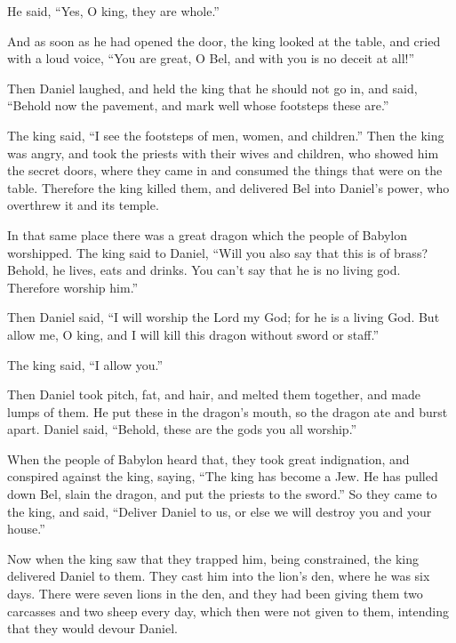 He said, ``Yes, O king, they are whole.''

 And as soon as he had opened the door, the king looked at
the table, and cried with a loud voice, ``You are great, O Bel, and with
you is no deceit at all!''

 Then Daniel laughed, and held the king that he should not
go in, and said, ``Behold now the pavement, and mark well whose
footsteps these are.''

 The king said, ``I see the footsteps of men, women, and
children.'' Then the king was angry,  and took the priests
with their wives and children, who showed him the secret doors, where
they came in and consumed the things that were on the table.
 Therefore the king killed them, and delivered Bel into
Daniel's power, who overthrew it and its temple.

 In that same place there was a great dragon which the
people of Babylon worshipped.  The king said to Daniel,
``Will you also say that this is of brass? Behold, he lives, eats and
drinks. You can't say that he is no living god. Therefore worship him.''

 Then Daniel said, ``I will worship the Lord my God; for he
is a living God.  But allow me, O king, and I will kill
this dragon without sword or staff.''

The king said, ``I allow you.''

 Then Daniel took pitch, fat, and hair, and melted them
together, and made lumps of them. He put these in the dragon's mouth, so
the dragon ate and burst apart. Daniel said, ``Behold, these are the
gods you all worship.''

 When the people of Babylon heard that, they took great
indignation, and conspired against the king, saying, ``The king has
become a Jew. He has pulled down Bel, slain the dragon, and put the
priests to the sword.''  So they came to the king, and
said, ``Deliver Daniel to us, or else we will destroy you and your
house.''

 Now when the king saw that they trapped him, being
constrained, the king delivered Daniel to them.  They cast
him into the lion's den, where he was six days.  There were
seven lions in the den, and they had been giving them two carcasses and
two sheep every day, which then were not given to them, intending that
they would devour Daniel.

